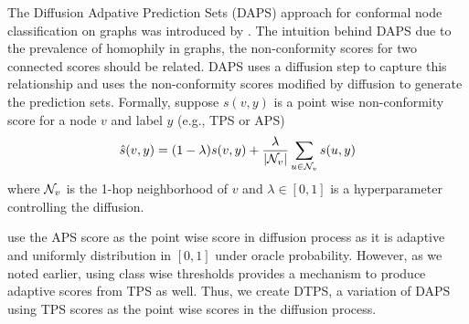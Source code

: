 The Diffusion Adpative Prediction Sets (DAPS) approach for conformal node classification on graphs was introduced by \citet{zargarbashi23conformal}.
The intuition behind DAPS due to the prevalence of homophily in graphs, the non-conformity scores for two connected scores should be related.
DAPS uses a diffusion step to capture this relationship and uses the non-conformity scores modified by diffusion to generate the prediction sets.
Formally, suppose $s(v, y)$ is a point wise non-conformity score for a node $v$ and label $y$ (e.g., TPS or APS)
\[
    \hat{s}(v, y) = (1 - \lambda) s(v, y) + \frac{\lambda}{|
    {\mathcal{N}}_v|} \sum\limits_{u \in {\mathcal{N}}_v} s(u, y)
\]
where ${\mathcal{N}}_v$ is the 1-hop neighborhood of $v$ and $\lambda \in [0, 1]$ is a hyperparameter controlling the diffusion.

\citet{zargarbashi23conformal} use the APS score as the point wise score in diffusion process as it is adaptive and uniformly distribution in $[0, 1]$ under oracle probability.
However, as we noted earlier, using class wise thresholds provides a mechanism to produce adaptive scores from TPS as well.
Thus, we create DTPS, a variation of DAPS using TPS scores as the point wise scores in the diffusion process.